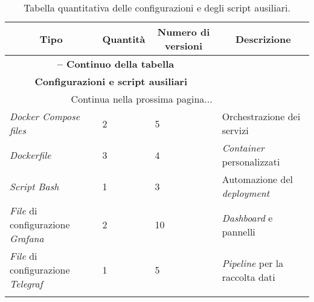 \begin{center}
\begin{longtable}{|p{}|p{}|p{}|p{}|}
\hline
\multicolumn{1}{|c|}{\textbf{Tipo}} & 
\multicolumn{1}{c|}{\textbf{Quantità}} & 
\multicolumn{1}{|c|}{\textbf{Numero di versioni}} & 
\multicolumn{1}{c|}{\textbf{Descrizione}} \\ 
\hline
\endfirsthead

\multicolumn{3}{c}{{\bfseries \tablename\ \thetable{} -- Continuo della tabella}}\\
\hline
\multicolumn{3}{|c|}{\textbf{Configurazioni e script ausiliari}} \\ \hline
\endhead

\hline \multicolumn{3}{|r|}{{Continua nella prossima pagina...}} \\ \hline
\endfoot

\endlastfoot

\textit{Docker Compose files} & 2 & 5 & Orchestrazione dei servizi \\ \hline
\textit{Dockerfile} & 3 & 4 & \textit{Container} personalizzati \\ \hline
\textit{Script Bash} & 1 & 3 & Automazione del \textit{deployment} \\ \hline
\textit{File} di configurazione \textit{Grafana} & 2 & 10 & \textit{Dashboard} e pannelli \\ \hline
\textit{File} di configurazione \textit{Telegraf} & 1 & 5 & \textit{Pipeline} per la raccolta dati \\ \hline

\caption{Tabella quantitativa delle configurazioni e degli script ausiliari.}
\label{tab:configurazioni-script}
\end{longtable}
\end{center}

